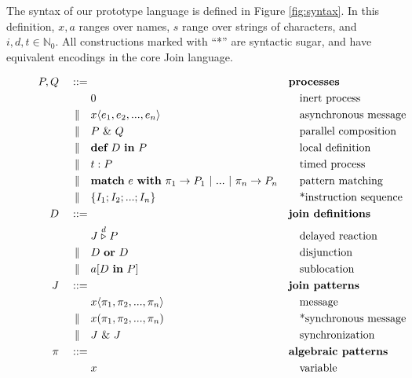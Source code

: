 The syntax of our prototype language is defined in Figure \ref{fig:syntax}. In
this definition, $x,a$ ranges over names, $s$ range over strings of characters,
and $i,d,t \in \mathbb{N}_0$. All constructions marked with ``*'' are syntactic
sugar, and have equivalent encodings in the core Join language.

\begin{figure}
\begin{align*}
P,Q\quad::={}&             && \textbf{processes} \\
          & 0              && \quad\textrm{inert process} \\
 \alt\quad& x\langle e_1, e_2, ..., e_n \rangle
                           && \quad\textrm{asynchronous message} \\
 \alt\quad& P~\&~Q         && \quad\textrm{parallel composition} \\
 \alt\quad& \textbf{def}~D~\textbf{in}~P
                           && \quad\textrm{local definition} \\
 \alt\quad& t : P          && \quad\textrm{timed process} \\
 \alt\quad& \textbf{match}~e~\textbf{with}~\pi_1
               \rightarrow P_1 ~|~ ... ~|~ \pi_n \rightarrow P_n
                           && \quad\textrm{pattern matching} \\
 \alt\quad& \{ I_1; I_2; ...; I_n \}
                           && \quad\textrm{*instruction sequence} \\
D\quad ::={}&              && \textbf{join definitions} \\
         & J \stackrel{d}{\triangleright} P
                           && \quad\textrm{delayed reaction} \\
\alt\quad& D~\textbf{or}~D && \quad\textrm{disjunction} \\
\alt\quad& a[D~\textbf{in}~P] && \quad\textrm{sublocation} \\
J\quad ::={}&              && \textbf{join patterns}\\
         & x\langle \pi_1, \pi_2, ..., \pi_n \rangle
                           && \quad\textrm{message} \\
\alt\quad& x(\pi_1, \pi_2, ..., \pi_n)
                           && \quad\textrm{*synchronous message} \\
\alt\quad& J~\&~J          && \quad\textrm{synchronization} \\
\pi\quad ::={}&            && \textbf{algebraic patterns} \\
         & x               && \quad\textrm{variable} \\

\end{align*}
\end{figure}
